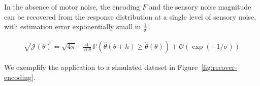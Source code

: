 \begin{thm}\label{lemma:f-exact}
    In the absence of motor noise, the encoding $F$ and the sensory noise magnitude can be recovered from the response distribution at a single level of sensory noise, with estimation error exponentially small in $\frac{1}{\sigma}$. 

\begin{align*}
 \sqrt{\mathcal{J}(\theta)} = \sqrt{4\pi} \cdot \frac{\operatorname{d}}{\operatorname{d}\theta} \mathbb{P}(\widehat{\theta}(\theta+h) \geq \widehat{\theta}(\theta)) + \mathcal{O}(\exp(-1/\sigma))
\end{align*}
    
\end{thm}
We exemplify the application to a simulated dataset in Figure~\ref{fig:recover-encoding}.
